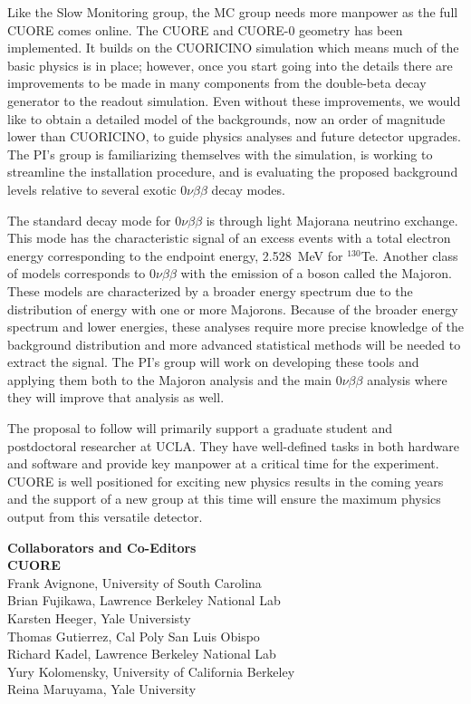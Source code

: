 \documentclass[11pt]{article}
\begin{document}
Like the Slow Monitoring group, the MC group needs more manpower as the full CUORE comes online. The CUORE and CUORE-0 geometry has been implemented. It builds on the CUORICINO simulation which means much of the basic physics is in place; however, once you start going into the details there are improvements to be made in many components from the double-beta decay generator to the readout simulation. Even without these improvements, we would like to obtain a detailed model of the backgrounds, now an order of magnitude lower than CUORICINO, to guide physics analyses and future detector upgrades. The PI's group is familiarizing themselves with the simulation, is working to streamline the installation procedure, and is evaluating the proposed background levels relative to several exotic $0\nu\beta\beta$ decay modes.

The standard decay mode for $0\nu\beta\beta$ is through light Majorana neutrino exchange. This mode has the characteristic signal of an excess events with a total electron energy corresponding to the endpoint energy, 2.528~MeV for $^{130}$Te. Another class of models corresponds to $0\nu\beta\beta$ with the emission of a boson called the Majoron\cite{Gelmini:1980re,Burgess:1993xh, Bamert:1994hb}. These models are characterized by a broader energy spectrum due to the distribution of energy with one or more Majorons. Because of the broader energy spectrum and lower energies, these analyses require more precise knowledge of the background distribution and more advanced statistical methods will be needed to extract the signal. The PI's group will work on developing these tools and applying them both to the Majoron analysis and the main $0\nu\beta\beta$ analysis where they will improve that analysis as well.

The proposal to follow will primarily support a graduate student and postdoctoral researcher at UCLA. They have well-defined tasks in both hardware and software and provide key manpower at a critical time for the experiment. CUORE is well positioned for exciting new physics results in the coming years and the support of a new group at this time will ensure the maximum physics output from this versatile detector.

 

\newpage
\noindent
{\large \textbf{Collaborators and Co-Editors} }\\

\textbf{CUORE}\\
Frank Avignone, University of South Carolina\\
Brian Fujikawa, Lawrence Berkeley National Lab \\
Karsten Heeger, Yale Universisty\\
Thomas Gutierrez, Cal Poly San Luis Obispo \\
Richard Kadel, Lawrence Berkeley National Lab \\
Yury Kolomensky, University of California Berkeley\\
Reina Maruyama, Yale University\\
\end{document}

